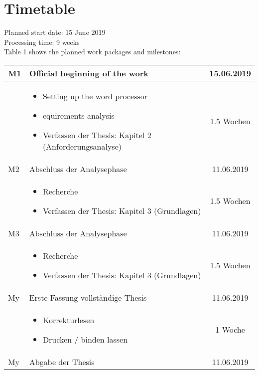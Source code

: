 \section{Timetable}
\label{sec:timetable}
\renewcommand{\arraystretch}{1.5}

Planned start date: 15 June 2019
\\
Processing time: 9 weeks
\\
Table 1 shows the planned work packages and milestones:
\\

	\begin{flushleft}
	    \begin{tabular}{ | l | p{10cm} | c |}
	    \hline
	    M1 & Official beginning of the work & 15.06.2019 \\ 
	    \hline
	    & \begin{itemize}
            \item Setting up the word processor
            \item equirements analysis
            \item Verfassen der Thesis: Kapitel 2 (Anforderungsanalyse)
	        \end{itemize} & 1.5 Wochen \\
		\hline
		M2 & Abschluss der Analysephase & 11.06.2019 \\ 
	    \hline
	    & \begin{itemize}
            \item Recherche
            \item Verfassen der Thesis: Kapitel 3 (Grundlagen)
	        \end{itemize} & 1.5 Wochen \\
	    \hline
	    M3 & Abschluss der Analysephase & 11.06.2019 \\ 
	    \hline
	    & \begin{itemize}
	    	\item Recherche
	    	\item Verfassen der Thesis: Kapitel 3 (Grundlagen)
	    \end{itemize} & 1.5 Wochen \\
		\hline
		My & Erste Fassung vollständige Thesis & 11.06.2019 \\ 
	    \hline
	    & \begin{itemize}
	    	\item Korrekturlesen
	    	\item Drucken / binden lassen
	    \end{itemize} & 1 Woche \\
		\hline
		My & Abgabe der Thesis & 11.06.2019 \\ 
		\hline
		\end{tabular}
	\end{flushleft}
